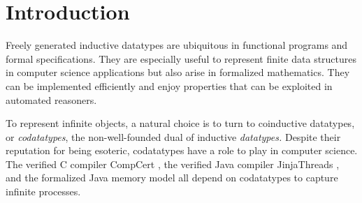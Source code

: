 \begin{nomemoriam}
\smallskipamount
\end{nomemoriam}

\setcounter{footnote}{0}

\section{Introduction}
\label{sec:introduction}

Freely generated inductive datatypes are ubiquitous in functional programs and
formal specifications. They are especially
useful to represent finite data structures in computer science applications but
also arise in formalized mathematics.
They can be implemented efficiently and enjoy
properties that can be exploited in automated reasoners.
%

To represent infinite objects, %
a natural choice is to turn to coinductive datatypes, or \emph{codatatypes},
the non-well-founded dual of inductive \emph{datatypes.}
%
Despite their reputation for being esoteric, codatatypes have a
role to play in computer science. The verified C compiler CompCert
\cite{leroy-2009}, the verified Java compiler Jinja\-Threads
\cite{lochbihler-2010-jinja}, and the formalized Java memory model
\cite{lochbihler-2014-jmm} all depend on codatatypes to capture infinite
processes.

